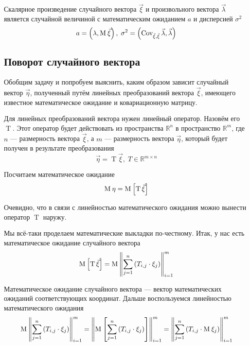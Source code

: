 \begin{affirmation}\label{affirmation:scalarMulTransformations}
    Скалярное произведение случайного вектора $\vec{\xi}$ и произвольного
    вектора $\vec{\lambda}$ является случайной величиной с математическим
    ожиданием $a$ и дисперсией $\sigma^2$
    $$a = \left( \lambda, \operatorname{M}_{} \vec{\xi} \right),\;
        \sigma^2
            = \left( \operatorname{Cov^{}_{\vec{\xi}, \vec{\xi}}} \vec{\lambda}, \vec{\lambda} \right)$$
\end{affirmation}

\subsection{Поворот случайного вектора}
Обобщим задачу и попробуем выяснить, каким образом зависит случайный вектор
$\vec{\eta}$, полученный путём линейных преобразований вектора $\vec{\xi}$,
имеющего известное математическое ожидание и ковариационную матрицу.

Для линейных преобразований вектора нужен линейный оператор. Назовём его
$\operatorname{T}$. Этот оператор будет действовать из пространства
$\mathbb{R}^n$
в пространство $\mathbb{R}^m$, где $n$ --- размерность вектора $\vec{\xi}$,
а $m$ --- размерность вектора $\vec{\eta}$, который будет получен
в результате преобразования
$$\vec{\eta} = \operatorname{T} \vec{\xi} ,\; T \in \mathbb{R}^{m \times n}$$

Посчитаем математическое ожидание
$$\operatorname{M}_{} \eta = \operatorname{M}_{} \left[ \operatorname{T} \vec{\xi}  \right]$$

Очевидно, что в связи с линейностью математического ожидания можно вынести
оператор $\operatorname{T}$ наружу.

Мы всё-таки проделаем математические выкладки по-честному.
Итак, у нас есть математическое ожидание случайного вектора
$$\operatorname{M}_{} \left[ \operatorname{T} \vec{\xi}  \right]
    = \operatorname{M}_{} \left\| \sum_{j=1}^n \left( T_{i,j} \cdot \xi_j \right)
        \right\|_{i=1}^m$$

Математическое ожидание случайного вектора --- вектор математических ожиданий
соответствующих координат.
Дальше воспользуемся линейностью математического ожидания
$$\operatorname{M}_{} \left\| \sum_{j=1}^n \left( T_{i,j} \cdot \xi_j \right)
        \right\|_{i=1}^m
    = \left\| \operatorname{M}_{} \left[ \sum_{j=1}^n \left( T_{i,j} \cdot \xi_j \right) \right]
        \right\|_{i=1}^m
    = \left\| \sum_{j=1}^n \left( T_{i,j} \cdot \operatorname{M}_{} \xi_j \right)
        \right\|_{i=1}^m$$


